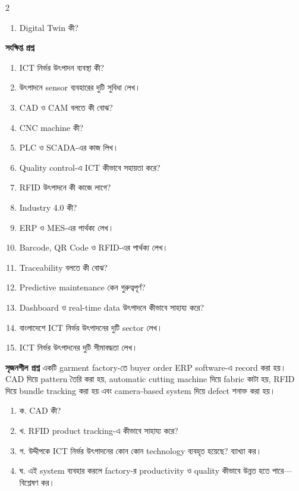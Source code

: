 \begin{practicebox}
\begin{multicols}{2}
\begin{enumerate}
\item \begin{minipage}[t]{\linewidth}Digital Twin কী?\par {}\par\end{minipage}
\end{enumerate}\end{multicols}

\textbf{সংক্ষিপ্ত প্রশ্ন}
\begin{enumerate}
\item ICT নির্ভর উৎপাদন ব্যবস্থা কী?
\item উৎপাদনে sensor ব্যবহারের দুটি সুবিধা লেখ।
\item CAD ও CAM বলতে কী বোঝ?
\item CNC machine কী?
\item PLC ও SCADA-এর কাজ লিখ।
\item Quality control-এ ICT কীভাবে সহায়তা করে?
\item RFID উৎপাদনে কী কাজে লাগে?
\item Industry 4.0 কী?
\item ERP ও MES-এর পার্থক্য লেখ।
\item Barcode, QR Code ও RFID-এর পার্থক্য লেখ।
\item Traceability বলতে কী বোঝ?
\item Predictive maintenance কেন গুরুত্বপূর্ণ?
\item Dashboard ও real-time data উৎপাদনে কীভাবে সাহায্য করে?
\item বাংলাদেশে ICT নির্ভর উৎপাদনের দুটি sector লেখ।
\item ICT নির্ভর উৎপাদনের দুটি সীমাবদ্ধতা লেখ।
\end{enumerate}

\textbf{সৃজনশীল প্রশ্ন}
একটি garment factory-তে buyer order ERP software-এ record করা হয়। CAD দিয়ে pattern তৈরি করা হয়, automatic cutting machine দিয়ে fabric কাটা হয়, RFID দিয়ে bundle tracking করা হয় এবং camera-based system দিয়ে defect শনাক্ত করা হয়।

\begin{enumerate}
\item ক. CAD কী?
\item খ. RFID product tracking-এ কীভাবে সাহায্য করে?
\item গ. উদ্দীপকে ICT নির্ভর উৎপাদনের কোন কোন technology ব্যবহৃত হয়েছে? ব্যাখ্যা কর।
\item ঘ. এই system ব্যবহার করলে factory-র productivity ও quality কীভাবে উন্নত হতে পারে—বিশ্লেষণ কর।
\end{enumerate}
\end{practicebox}

